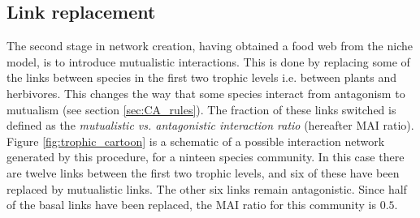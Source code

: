 \subsection{Link replacement}
\label{sec:link_replacement}

The second stage in network creation, having obtained a food web from the niche model, is to introduce mutualistic interactions. This is done by replacing some of the links between species in the first two trophic levels i.e. between plants and herbivores. This changes the way that some species interact from antagonism to mutualism (see section \ref{sec:CA_rules}). The fraction of these links switched is defined as the \emph{mutualistic vs. antagonistic interaction ratio} (hereafter MAI ratio). Figure \ref{fig:trophic_cartoon} is a schematic of a possible interaction network generated by this procedure, for a ninteen species community. In this case there are twelve links between the first two trophic levels, and six of these have been replaced by mutualistic links. The other six links remain antagonistic. Since half of the basal links have been replaced, the MAI ratio for this community is $0.5$.



